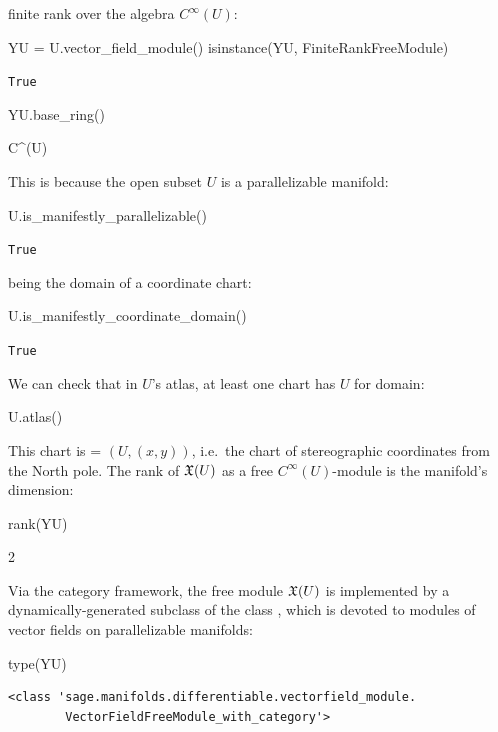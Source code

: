 finite rank over the algebra $C^\infty(U)$:
\begin{NBin}
YU = U.vector_field_module()
isinstance(YU, FiniteRankFreeModule)
\end{NBin}
\begin{NBout}
\texttt{True}
\end{NBout}
\begin{NBin}
YU.base_ring()
\end{NBin}
\begin{NBoutM}
C^{\infty}\left(U\right)
\end{NBoutM}
This is because the open subset $U$ is a parallelizable manifold:
\begin{NBin}
U.is_manifestly_parallelizable()
\end{NBin}
\begin{NBout}
\texttt{True}
\end{NBout}
being the domain of a coordinate chart:
\begin{NBin}
U.is_manifestly_coordinate_domain()
\end{NBin}
\begin{NBout}
\texttt{True}
\end{NBout}
We can check that in $U$'s atlas, at least one chart has $U$ for domain:
\begin{NBin}
U.atlas()
\end{NBin}
\begin{NBoutM}
\end{NBoutM}
This chart is  = $(U, (x,y))$, i.e.\ the chart of stereographic coordinates
from the North pole.
The rank of $\mathfrak{X}(U)$ as a free $C^\infty(U)$-module is the manifold's dimension:
\begin{NBin}
rank(YU)
\end{NBin}
\begin{NBoutM}
2
\end{NBoutM}
Via the category framework,
the free module $\mathfrak{X}(U)$ is implemented by a dynamically-generated subclass
of the class , which is devoted to modules of vector fields
on parallelizable manifolds:
\begin{NBin}
type(YU)
\end{NBin}
\begin{NBout}
\begin{verbatim}
<class 'sage.manifolds.differentiable.vectorfield_module.
        VectorFieldFreeModule_with_category'>
\end{verbatim}
\end{NBout}
